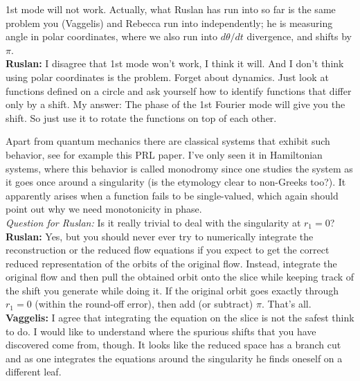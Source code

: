 \medskip{} 1st mode will not work. Actually,
what Ruslan has run into so far is the same problem you
(Vaggelis) and Rebecca run into independently; he is
measuring angle in polar coordinates, where we also run into
$d\theta/dt$ divergence, and shifts by $\pi$.
\\
{\bf Ruslan:} I disagree that 1st mode won't work, I think it
will. And I don't think using polar coordinates is the
problem.  Forget about dynamics.  Just look at functions
defined on a circle and ask yourself how to identify
functions that differ only by a shift.  My answer: The phase
of the 1st Fourier mode will give you the shift.  So just use
it to rotate the functions on top of each other.

 Apart from quantum mechanics there
are classical systems that exhibit such behavior, see for
example
{this PRL paper}. I've only seen it in Hamiltonian systems,
where this behavior is called monodromy since one studies the
system as it goes once around a singularity (is the etymology
clear to non-Greeks too?). It apparently arises when a
function fails to be single-valued, which again should point
out why we need monotonicity in phase.\\
\textit{Question for Ruslan:} Is it really trivial to deal
with the singularity at $r_1=0$?\\
{\bf Ruslan:} Yes, but you should never ever try to
numerically integrate the reconstruction or the reduced flow
equations if you expect to get the correct reduced
representation of the orbits of the original flow.  Instead,
integrate the original flow and then pull the obtained orbit
onto the slice while keeping track of the shift you generate
while doing it.  If the original orbit goes exactly through
$r_1 = 0$ (within the round-off error), then add (or
subtract) $\pi$.  That's all.\\
{\bf Vaggelis:}  I agree that integrating the equation on the
slice is not the safest think to do. I would like to
understand where the spurious shifts that you have discovered
come from, though. It looks like the reduced space has a
branch cut and as one integrates the equations around the
singularity he finds oneself on a different leaf.

